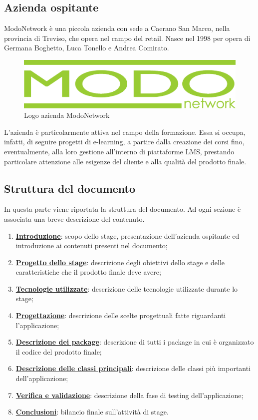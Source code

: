 \documentclass[../Tesi.tex]{subfiles}
\begin{document}
	\subsection{Azienda ospitante}
	ModoNetwork è una piccola azienda con sede a Caerano San Marco, nella provincia di Treviso, che opera nel campo del retail. Nasce nel 1998 per opera di Germana Boghetto, Luca Tonello e Andrea Comirato.
	\begin{figure}[H]
		\centering
		\includegraphics[scale=0.1]{images/logoMN}
		\caption{Logo azienda ModoNetwork}
	\end{figure}
	L'azienda è particolarmente attiva nel campo della formazione. Essa si occupa, infatti, di seguire progetti di e-learning, a partire dalla creazione dei corsi fino, eventualmente, alla loro gestione all'interno di piattaforme LMS, prestando particolare attenzione alle esigenze del cliente e alla qualità del prodotto finale.

	\subsection{Struttura del documento}
		In questa parte viene riportata la struttura del documento. Ad ogni sezione è associata una breve descrizione del contenuto.
		\begin{enumerate}
			\item \hyperref[sec:introduzione]{\textbf{Introduzione}}: scopo dello stage, presentazione dell'azienda ospitante ed introduzione ai contenuti presenti nel documento;
			\item \hyperref[sec:progettoStage]{\textbf{Progetto dello stage}}: descrizione degli obiettivi dello stage e delle caratteristiche che il prodotto finale deve avere;
			\item \hyperref[sec:tecnologieUtilizzate]{\textbf{Tecnologie utilizzate}}: descrizione delle tecnologie utilizzate durante lo stage;
			\item \hyperref[sec:progettazione]{\textbf{Progettazione}}: descrizione delle scelte progettuali fatte riguardanti l'applicazione;
			\item \hyperref[sec:descrizionaDeiPackage]{\textbf{Descrizione dei package}}: descrizione di tutti i package in cui è organizzato il codice del prodotto finale;
			\item \hyperref[sec:descrizioneDelleClassiPrincipali]{\textbf{Descrizione delle classi principali}}: descrizione delle classi più importanti dell'applicazione;
			\item \hyperref[sec:VerificaEValidazione]{\textbf{Verifica e validazione}}: descrizione della fase di testing dell'applicazione;
			\item \hyperref[sec:conclusioni]{\textbf{Conclusioni}}: bilancio finale sull'attività di stage.
		\end{enumerate}
\end{document}

